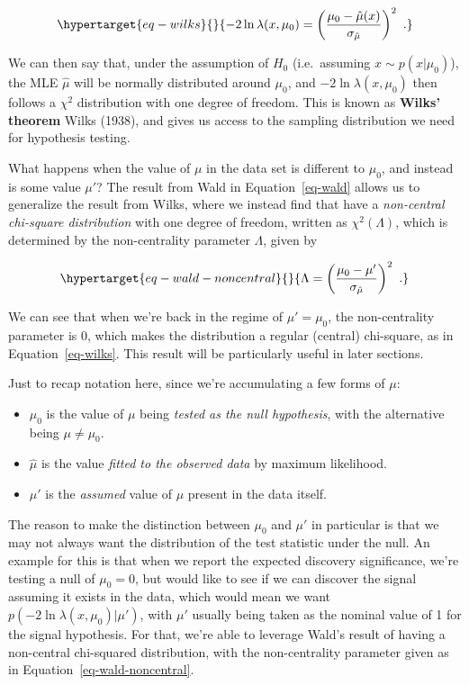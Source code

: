 \documentclass[
  11pt,
  numbers=noendperiod]{book}
\providecommand{\tightlist}{%
  \setlength{\itemsep}{0pt}\setlength{\parskip}{0pt}}\usepackage{longtable,booktabs,array}
\begin{document}
\begin{equation}\protect\hypertarget{eq-wilks}{}{
-2\ln \lambda(x,\mu_0) = \left(\frac{\mu_0 - \hat{\mu}(x)}{\sigma_{\hat{\mu}}}\right)^2 ~.
}\label{eq-wilks}\end{equation}

We can then say that, under the assumption of \(H_0\) (i.e.~assuming
\(x\sim p(x|\mu_0)\)), the MLE \(\hat{\mu}\) will be normally
distributed around \(\mu_0\), and \(-2\ln \lambda(x,\mu_0)\) then
follows a \(\chi^2\) distribution with one degree of freedom. This is
known as \textbf{Wilks' theorem} Wilks (1938), and gives us access to
the sampling distribution we need for hypothesis testing.

What happens when the value of \(\mu\) in the data set is different to
\(\mu_0\), and instead is some value \(\mu'\)? The result from Wald in
Equation~\ref{eq-wald} allows us to generalize the result from Wilks,
where we instead find that have a \emph{non-central chi-square
distribution} with one degree of freedom, written as
\(\chi^2(\Lambda)\), which is determined by the non-centrality parameter
\(\Lambda\), given by

\begin{equation}\protect\hypertarget{eq-wald-noncentral}{}{
\Lambda = \left(\frac{\mu_0 - \mu'}{\sigma_{\hat{\mu}}}\right)^2 ~.
}\label{eq-wald-noncentral}\end{equation}

We can see that when we're back in the regime of \(\mu'=\mu_0\), the
non-centrality parameter is 0, which makes the distribution a regular
(central) chi-square, as in Equation~\ref{eq-wilks}. This result will be
particularly useful in later sections.

Just to recap notation here, since we're accumulating a few forms of
\(\mu\):

\begin{itemize}
\tightlist
\item
  \(\mu_0\) is the value of \(\mu\) being \emph{tested as the null
  hypothesis}, with the alternative being \(\mu\neq\mu_0\).
\item
  \(\hat{\mu}\) is the value \emph{fitted to the observed data} by
  maximum likelihood.
\item
  \(\mu'\) is the \emph{assumed} value of \(\mu\) present in the data
  itself.
\end{itemize}

The reason to make the distinction between \(\mu_0\) and \(\mu'\) in
particular is that we may not always want the distribution of the test
statistic under the null. An example for this is that when we report the
expected discovery significance, we're testing a null of \(\mu_0=0\),
but would like to see if we can discover the signal assuming it exists
in the data, which would mean we want
\(p(-2\ln \lambda(x,\mu_0) | \mu')\), with \(\mu'\) usually being taken
as the nominal value of 1 for the signal hypothesis. For that, we're
able to leverage Wald's result of having a non-central chi-squared
distribution, with the non-centrality parameter given as in
Equation~\ref{eq-wald-noncentral}.
\end{document}
